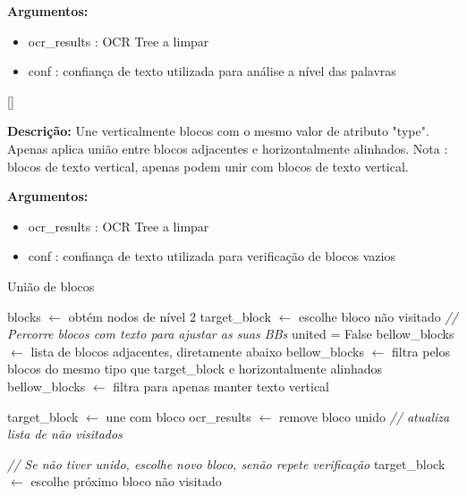 \textbf{Argumentos:}
\begin{itemize}\setlength\itemsep{-0.3em}
	\item ocr\_results : OCR Tree a limpar
	\item conf : confiança de texto utilizada para análise a nível das palavras
\end{itemize}


[\normalsize]

\textbf{Descrição:} Une verticalmente blocos com o mesmo valor de atributo "type". Apenas aplica união entre blocos adjacentes e horizontalmente alinhados. Nota : blocos de texto vertical, apenas podem unir com blocos de texto vertical.

\textbf{Argumentos:}
\begin{itemize}\setlength\itemsep{-0.3em}
	\item ocr\_results : OCR Tree a limpar
	\item conf : confiança de texto utilizada para verificação de blocos vazios
\end{itemize}

\begin{algorithm}[H]
	\caption{União de blocos}
	\begin{algorithmic}[1]
		
		\STATE blocks $\leftarrow$ obtém nodos de nível 2
		\STATE target\_block $\leftarrow$ escolhe bloco não visitado
		\STATE \textit{// Percorre blocos com texto para ajustar as suas BBs}
			\STATE united = False
			\STATE bellow\_blocks $\leftarrow$ lista de blocos adjacentes, diretamente abaixo
			\STATE bellow\_blocks $\leftarrow$ filtra pelos blocos do mesmo tipo que target\_block e horizontalmente alinhados
					\STATE bellow\_blocks $\leftarrow$ filtra para apenas manter texto vertical
				\ENDIF
				
					\STATE target\_block $\leftarrow$ une com bloco
					\STATE ocr\_results $\leftarrow$ remove bloco unido
					\STATE \textit{// atualiza lista de não visitados}
				\ENDIF
				
			\ENDIF
			
			\STATE \textit{// Se não tiver unido, escolhe novo bloco, senão repete verificação}
				\STATE target\_block $\leftarrow$ escolhe próximo bloco não visitado
			\ENDIF
		\ENDWHILE
		
		
	\end{algorithmic}
\end{algorithm}

